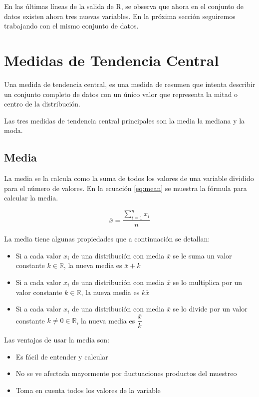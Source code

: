 \documentclass[]{book}
\providecommand{\tightlist}{%
  \setlength{\itemsep}{0pt}\setlength{\parskip}{0pt}}
\begin{document}
En las últimas líneas de la salida de R, se observa que ahora en el
conjunto de datos existen ahora tres nuevas variables. En la próxima
sección seguiremos trabajando con el mismo conjunto de datos.

\section{Medidas de Tendencia
Central}\label{medidas-de-tendencia-central}

Una medida de tendencia central, es una medida de resumen que intenta
describir un conjunto completo de datos con un único valor que
representa la mitad o centro de la distribución.

Las tres medidas de tendencia central principales son la media la
mediana y la moda.

\subsection{Media}\label{media}

La media se la calcula como la suma de todos los valores de una variable
dividido para el número de valores. En la ecuación \eqref{eq:mean} se
muestra la fórmula para calcular la media.

\begin{equation} 
  \bar{x} = \dfrac{\sum_{i=1}^{n}x_i}{n}
  \label{eq:mean}
\end{equation}

La media tiene algunas propiedades que a continuación se detallan:

\begin{itemize}
\tightlist
\item
  Si a cada valor \(x_i\) de una distribución con media \(\bar{x}\) se
  le suma un valor constante \(k \in \mathbb{R}\), la nueva media es
  \(\bar{x}+k\)
\item
  Si a cada valor \(x_i\) de una distribución con media \(\bar{x}\) se
  lo multiplica por un valor constante \(k \in \mathbb{R}\), la nueva
  media es \(k\bar{x}\)
\item
  Si a cada valor \(x_i\) de una distribución con media \(\bar{x}\) se
  lo divide por un valor constante \(k \neq 0 \in \mathbb{R}\), la nueva
  media es \(\dfrac{\bar{x}}{k}\)
\end{itemize}

Las ventajas de usar la media son:

\begin{itemize}
\tightlist
\item
  Es fácil de entender y calcular
\item
  No se ve afectada mayormente por fluctuaciones productos del muestreo
\item
  Toma en cuenta todos los valores de la variable
\end{itemize}
\end{document}
